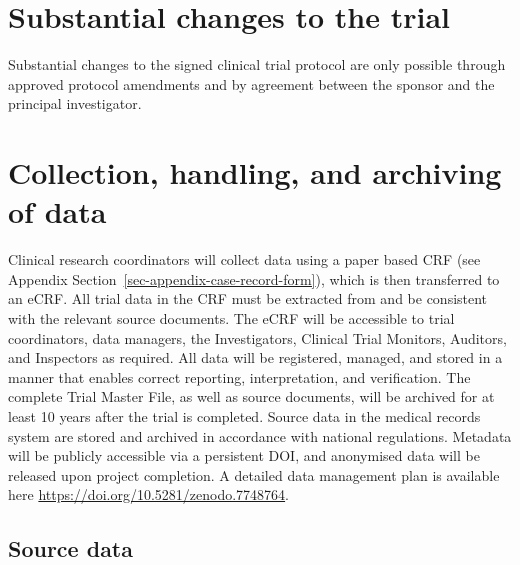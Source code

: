 \documentclass[
]{scrartcl}
\begin{document}
\hypertarget{substantial-changes-to-the-trial}{%
\section{Substantial changes to the
trial}\label{substantial-changes-to-the-trial}}

Substantial changes to the signed clinical trial protocol are only
possible through approved protocol amendments and by agreement between
the sponsor and the principal investigator.

\hypertarget{collection-handling-and-archiving-of-data}{%
\section{Collection, handling, and archiving of
data}\label{collection-handling-and-archiving-of-data}}

Clinical research coordinators will collect data using a paper based CRF
(see Appendix Section~\ref{sec-appendix-case-record-form}), which is
then transferred to an eCRF. All trial data in the CRF must be extracted
from and be consistent with the relevant source documents. The eCRF will
be accessible to trial coordinators, data managers, the Investigators,
Clinical Trial Monitors, Auditors, and Inspectors as required. All data
will be registered, managed, and stored in a manner that enables correct
reporting, interpretation, and verification. The complete Trial Master
File, as well as source documents, will be archived for at least 10
years after the trial is completed. Source data in the medical records
system are stored and archived in accordance with national regulations.
Metadata will be publicly accessible via a persistent DOI, and
anonymised data will be released upon project completion. A detailed
data management plan is available here
\url{https://doi.org/10.5281/zenodo.7748764}.

\hypertarget{source-data}{%
\subsection{Source data}\label{source-data}}
\end{document}
